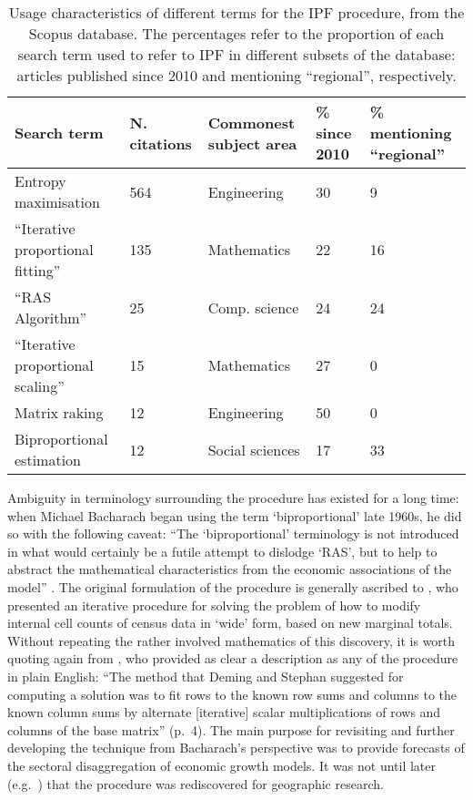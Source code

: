 \documentclass[a4paper,10pt]{article}
\begin{document}
\begin{table}[htbp]
\caption{Usage characteristics of different terms for the IPF procedure, from the Scopus database.
The percentages refer to the proportion of each search term used to refer to IPF in different
subsets of the database: articles published since 2010 and mentioning ``regional'', respectively.}

\begin{center}
\begin{tabular}{lp{1.5cm}p{2.5cm}p{1.5cm}p{2.5cm}}
\toprule
Search term & N. citations & Commonest subject area & \% since 2010 & \% mentioning ``regional'' \\
\midrule
Entropy maximisation & 564 & Engineering & 30 & 9 \\
``Iterative proportional fitting''  & 135 & Mathematics & 22\ & 16 \\
``RAS Algorithm'' & 25 & Comp. science & 24 & 24 \\
``Iterative proportional scaling'' & 15 & Mathematics & 27 & 0 \\
Matrix raking & 12 & Engineering & 50 & 0 \\
Biproportional estimation & 12 & Social sciences & 17 & 33 \\
\bottomrule
\end{tabular}
\end{center}
\label{tterms}
\end{table}

Ambiguity in terminology surrounding the procedure has existed for a long time:
when Michael Bacharach began using the term `biproportional' late 1960s, he did so with the
following caveat: ``The `biproportional' terminology is not introduced in what
would certainly be a futile attempt to dislodge `RAS', but to help to abstract the
mathematical characteristics from the economic associations of the model'' \citep{bacharach1970biproportional}.
The original formulation of the procedure is generally ascribed to \citet{Deming1940},
who presented an iterative procedure for solving the problem of how to modify internal cell counts
of census data in `wide' form, based on new marginal totals. Without repeating
the rather involved mathematics of this discovery, it is worth quoting again from
\citet{bacharach1970biproportional}, who provided as clear a description as any of the procedure
in plain English: ``The method that Deming and Stephan suggested for
computing a solution was to fit rows to the known row sums and columns to the known
column sums by alternate [iterative] scalar multiplications of rows and columns of the
base matrix'' (p.~4). The main purpose for revisiting and further developing the technique
from Bacharach's perspective was to provide forecasts of the sectoral disaggregation of
economic growth models. It was not until later
(e.g.~\citealp{Holm1987}) that the procedure was rediscovered for geographic research.
\end{document}
